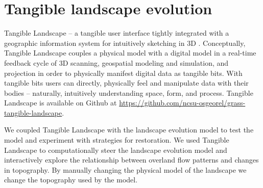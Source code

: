 \documentclass[final,3p,times,twocolumn]{elsarticle}
\begin{document}
%

\clearpage
\section{Tangible landscape evolution}

Tangible Landscape -- a tangible user interface tightly integrated with a geographic information system for intuitively sketching in 3D \cite{petrasova2015}. Conceptually, Tangible Landscape couples a physical model with a digital model in a real-time feedback cycle of 3D scanning, geospatial modeling and simulation, and projection in order to physically manifest digital data as tangible bits. With tangible bits users can directly, physically feel and manipulate data with their bodies -- naturally, intuitively understanding space, form, and process. Tangible Landscape is available on Github at \url{https://github.com/ncsu-osgeorel/grass-tangible-landscape}.

We coupled Tangible Landscape with the landscape evolution model to test the model and experiment with strategies for restoration. 
We used Tangible Landscape to computationally steer the landscape evolution model and interactively explore the relationship between overland flow patterns and changes in topography. By manually changing the physical model of the landscape 
we change the topography used by the model.
\end{document}
